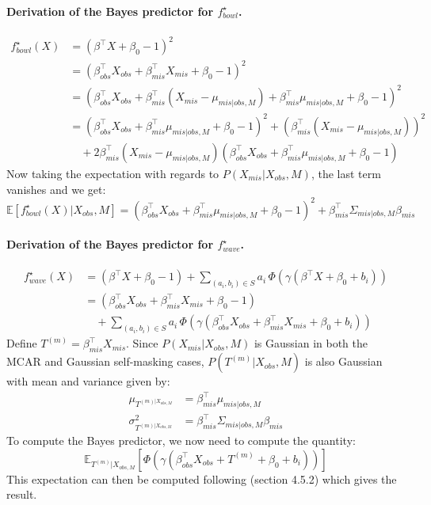 \documentclass{article}
\newcommand{\E}{\mathbb{E}}
\newcommand{\br}[1]{\left(#1\right)}
\newcommand{\sqb}[1]{\left[#1\right]}
\theoremstyle{plain}
\begin{document}
\paragraph{Derivation of the Bayes predictor for $f^\star_{bowl}$.}
\begin{align}
    f^\star_{bowl}(X) &= \br{\beta^\top X + \beta_0 -1}^2\\
    &= \br{\beta_{obs}^\top X_{obs} + \beta_{mis}^\top X_{mis} + \beta_0 - 1}^2\\
    &= \br{\beta_{obs}^\top X_{obs} + \beta_{mis}^\top (X_{mis}-\mu_{mis|obs, M}) + \beta_{mis}^\top \mu_{mis|obs, M} + \beta_0 - 1}^2\\
    &= \br{\beta_{obs}^\top X_{obs} + \beta_{mis}^\top \mu_{mis|obs, M} + \beta_0 - 1}^2 + \br{\beta_{mis}^\top (X_{mis}-\mu_{mis|obs, M})}^2\\
    & \quad + 2\beta_{mis}^\top (X_{mis}-\mu_{mis|obs, M})\br{\beta_{obs}^\top X_{obs} + \beta_{mis}^\top \mu_{mis|obs, M} + \beta_0 - 1}
\end{align}
Now taking the expectation with regards to $P(X_{mis}|X_{obs}, M)$, the last term vanishes and we get:
\begin{equation}
    \E \sqb{f^\star_{bowl}(X) | X_{obs}, M} = \br{\beta_{obs}^\top X_{obs} + \beta_{mis}^\top \mu_{mis|obs, M} + \beta_0 - 1}^2 + \beta_{mis}^\top \Sigma_{mis|obs, M} \beta_{mis}
\end{equation}

\paragraph{Derivation of the Bayes predictor for $f^\star_{wave}$.}
\begin{align}
    f^\star_{wave}(X) &= (\beta^\top X +\beta_0 -1) + \sum_{(a_i, b_i) \in S} a_i\,\Phi\br{\gamma \br{\beta^\top X + \beta_0 + b_i}}\\
    &= (\beta_{obs}^\top X_{obs} + \beta_{mis}^\top X_{mis} +\beta_0 -1)\\
    & \quad + \sum_{(a_i, b_i) \in S} a_i\,\Phi\br{\gamma \br{\beta_{obs}^\top X_{obs} + \beta_{mis}^\top X_{mis} + \beta_0 + b_i}}
\end{align}
Define $T^{(m)} = \beta_{mis}^\top X_{mis}$. Since $P(X_{mis}|X_{obs}, M)$ is Gaussian in both the MCAR and Gaussian self-masking cases, $P(T^{(m)}|X_{obs}, M)$ is also Gaussian with mean and variance given by:
\begin{align}
    \mu_{T^{(m)|X_{obs, M}}} &= \beta_{mis}^\top \mu_{mis|obs, M}\\
    \sigma^2_{T^{(m)|X_{obs, M}}} &= \beta_{mis}^\top  \Sigma_{mis|obs, M} \beta_{mis}
\end{align}
To compute the Bayes predictor, we now need to compute the quantity:
\begin{equation*}
    \E_{T^{(m)}|X_{obs, M}} \sqb{\Phi\br{\gamma \br{\beta_{obs}^\top X_{obs} + T^{(m)} + \beta_0 + b_i}}}
\end{equation*}
This expectation can then be computed following \citep{Bishop} (section 4.5.2) which gives the result.
\end{document}
